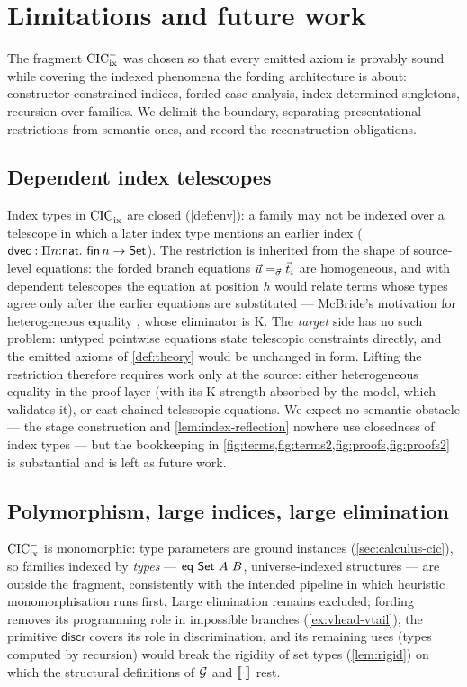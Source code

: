 \section{Limitations and future work}
\label{sec:limitations}

The fragment $\mathrm{CIC}^{-}_{\mathrm{ix}}$ was chosen so that every emitted axiom is provably
sound while covering the indexed phenomena the fording architecture is
about: constructor-constrained indices, forded case analysis,
index-determined singletons, recursion over families.  We delimit the
boundary, separating presentational restrictions from semantic ones,
and record the reconstruction obligations.

\subsection{Dependent index telescopes}
\label{sec:limitations-telescopes}

Index types in $\mathrm{CIC}^{-}_{\mathrm{ix}}$ are closed (\cref{def:env}): a family may not be
indexed over a telescope in which a later index type mentions an
earlier index ($\mathsf{dvec} : \Pi n{:}\mathsf{nat}.\ \mathsf{fin}\,n \to \mathsf{Set}$).  The
restriction is inherited from the shape of source-level equations: the
forded branch equations $\vec{u} =_{\vec{\sigma}} \vec{t}_i$ are
homogeneous, and with dependent telescopes the equation at position $h$
would relate terms whose types agree only after the earlier equations
are substituted --- McBride's motivation for heterogeneous equality
\cite{McBride1999}, whose eliminator is K.  The \emph{target} side has
no such problem: untyped pointwise equations state telescopic
constraints directly, and the emitted axioms of \cref{def:theory} would
be unchanged in form.  Lifting the restriction therefore requires work
only at the source: either heterogeneous equality in the proof layer
(with its K-strength absorbed by the model, which validates it), or
cast-chained telescopic equations.  We expect no semantic obstacle ---
the stage construction and \cref{lem:index-reflection} nowhere use
closedness of index types --- but the bookkeeping in
\cref{fig:terms,fig:terms2,fig:proofs,fig:proofs2} is substantial and is left as future work.

\subsection{Polymorphism, large indices, large elimination}
\label{sec:limitations-poly}

$\mathrm{CIC}^{-}_{\mathrm{ix}}$ is monomorphic: type parameters are ground instances
(\cref{sec:calculus-cic}), so families indexed by \emph{types} ---
$\mathsf{eq}\ \Set\ A\ B$, universe-indexed structures --- are outside
the fragment, consistently with the intended pipeline in which
heuristic monomorphisation runs first.  Large elimination remains
excluded; fording removes its programming role in impossible branches
(\cref{ex:vhead-vtail}), the primitive $\mathsf{discr}$ covers its
role in discrimination, and its remaining uses (types computed by
recursion) would break the rigidity of set types (\cref{lem:rigid}) on
which the structural definitions of $\mathcal{G}$ and
$[\![ \cdot ]\!]_{}$ rest.

